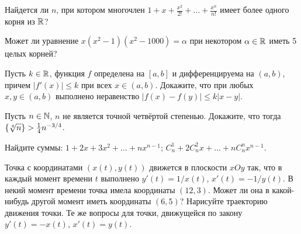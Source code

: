 \documentclass[a4paper, 12pt]{article}
\newcommand{\0}[1]{\overline{#1}}
\begin{document}






Найдется ли $n$, при котором многочлен
$1+x+\frac{x^2}{2!}+\dots+\frac{x^n}{n!}$ имеет %
более одного корня из $\mathbb{R}$?

 Может ли уравнение $x(x^2-1)(x^2-1000)=\alpha$ при некотором
$\alpha\in\mathbb{R}$ иметь 5 целых корней?


 Пусть $k\in\mathbb{R}$,
функция $f$ определена на $[a,b]$ и дифференцируема на $(a,b)$, причем $|f'(x)|\le k$
при всех $x\in(a,b)$. Докажите, что при любых $x,y\in (a,b)$ выполнено неравенство
$|f(x)-f(y)|\le k|x-y|$.

 Пусть $n\in\mathbb{N}$, $n$ не является точной четв\"ертой
степенью. Докажите, что тогда $\{\root{ 4} \of{ n}\}>\frac{1}{4}n^{-3/4}$.




Найдите суммы:
$1+2x+3x^2+\dots+nx^{n-1}$;
$C_n^1+2C_n^2x+\dots+nC_n^nx^{n-1}$.

Точка с координатами $(x(t),y(t))$ движется в %
плоскости $xOy$ так, что в каждый момент времени $t$ %
выполнено $y'(t)=1/x(t)$, $x'(t)=-1/y(t)$. %
В некий момент
времени точка имела координаты $(12,3)$. Может ли %
она в какой-нибудь другой момент %
иметь координаты $(6,5)$?
Нарисуйте траекторию движения точки.\qquad
{} Те же вопросы для точки, движущейся по закону
$y'(t)=-x(t)$, $x'(t)=y(t)$.

\end{document}
